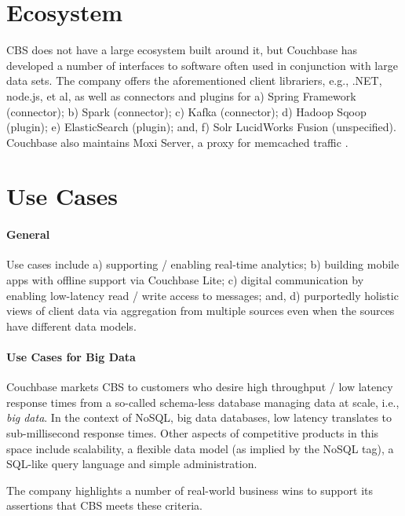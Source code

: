 \documentclass[9pt,twocolumn,twoside]{../../styles/osajnl}
\begin{document}
\section{Ecosystem} CBS does not have a large ecosystem built around it, but Couchbase has developed a number of interfaces to software often used in conjunction with large data sets.  The company offers the aforementioned client librariers, e.g., .NET, node.js, et al, as well as connectors and plugins for a) Spring Framework (connector); b) Spark (connector); c) Kafka (connector); d) Hadoop Sqoop (plugin); e) ElasticSearch (plugin); and, f) Solr LucidWorks Fusion (unspecified).  Couchbase also maintains Moxi Server, a proxy for memcached traffic \cite{www-downloads-cbsinc}.

\section{Use Cases}
\paragraph{General}
Use cases include a) supporting / enabling real-time analytics; b) building mobile apps with offline support via Couchbase Lite; c) digital communication by enabling low-latency read / write access to messages; and, d) purportedly holistic views of client data via aggregation from multiple sources even when the sources have different data models.

\paragraph{Use Cases for Big Data} Couchbase markets CBS to customers who desire high throughput / low latency response times from a so-called schema-less database managing data at scale, i.e., \textit{big data}. In the context of NoSQL, big data databases, low latency translates to sub-millisecond response times.  Other aspects of competitive products in this space include scalability, a flexible data model (as implied by the NoSQL tag), a SQL-like query language and simple administration.\cite{www-cbsintro-cbsinc}

The company highlights a number of real-world business wins to support its assertions that CBS meets these criteria.
\end{document}
